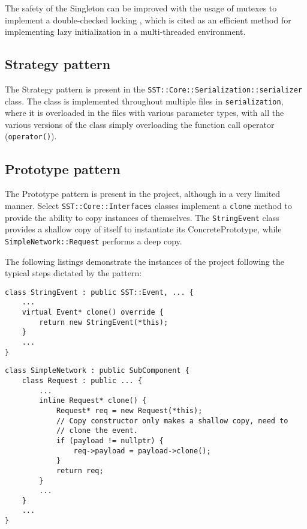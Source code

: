 The safety of the Singleton can be improved with the usage of mutexes to implement a double-checked locking \cite{dcl}, which is cited as an efficient method for implementing lazy initialization in a multi-threaded environment.

\subsection{Strategy pattern}
The Strategy pattern is present in the \texttt{SST::Core::Serialization::serializer} class. The class is implemented throughout multiple files in \texttt{serialization}, where it is overloaded in the files with various parameter types, with all the various versions of the class simply overloading the function call operator (\texttt{operator()}).

\subsection{Prototype pattern}
The Prototype pattern is present in the project, although in a very limited manner. Select \texttt{SST::Core::Interfaces} classes implement a \texttt{clone} method to provide the ability to copy instances of themselves. The \texttt{StringEvent} class provides a shallow copy of itself to instantiate its ConcretePrototype, while \texttt{SimpleNetwork::Request} performs a deep copy.

The following listings demonstrate the instances of the project following the typical steps dictated by the pattern:

\begin{lstlisting}[style=customC++,label=prototype1,caption=StringEvent Implementing the Prototype Pattern]
class StringEvent : public SST::Event, ... {
    ...
    virtual Event* clone() override {
        return new StringEvent(*this);
    }
    ...
}
\end{lstlisting}

\begin{lstlisting}[style=customC++,label=prototype2,caption=SimpleNetwork::Request Implementing the Prototype Pattern]
class SimpleNetwork : public SubComponent {
    class Request : public ... {
        ...
        inline Request* clone() {
            Request* req = new Request(*this);
            // Copy constructor only makes a shallow copy, need to
            // clone the event.
            if (payload != nullptr) {
                req->payload = payload->clone();
            }
            return req;
        }
        ...
    }
    ...
}
\end{lstlisting}
